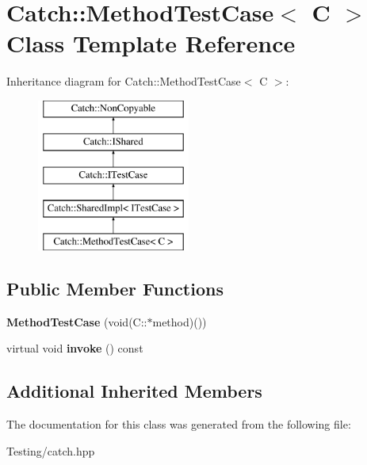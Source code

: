 \hypertarget{class_catch_1_1_method_test_case}{\section{Catch\-:\-:Method\-Test\-Case$<$ C $>$ Class Template Reference}
\label{class_catch_1_1_method_test_case}
}
Inheritance diagram for Catch\-:\-:Method\-Test\-Case$<$ C $>$\-:\begin{figure}[H]
\begin{center}
\leavevmode
\includegraphics[height=5.000000cm]{class_catch_1_1_method_test_case}
\end{center}
\end{figure}
\subsection*{Public Member Functions}
\begin{DoxyCompactItemize}
\item 
\hypertarget{class_catch_1_1_method_test_case_a7b043b85dae371358255dd9dc6582e7b}{{\bfseries Method\-Test\-Case} (void(C\-::$\ast$method)())}\label{class_catch_1_1_method_test_case_a7b043b85dae371358255dd9dc6582e7b}

\item 
\hypertarget{class_catch_1_1_method_test_case_a39cc4b760dd71adc3f7550bc1e7eb697}{virtual void {\bfseries invoke} () const }\label{class_catch_1_1_method_test_case_a39cc4b760dd71adc3f7550bc1e7eb697}

\end{DoxyCompactItemize}
\subsection*{Additional Inherited Members}


The documentation for this class was generated from the following file\-:\begin{DoxyCompactItemize}
\item 
Testing/catch.\-hpp\end{DoxyCompactItemize}

